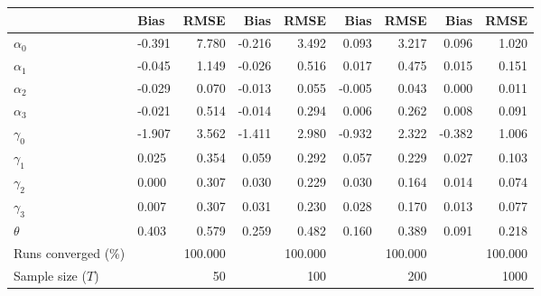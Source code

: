 
\begin{tabular}[t]{llrrrrrrr}
\toprule
  & Bias & RMSE & Bias & RMSE & Bias & RMSE & Bias & RMSE\\
\midrule
$\alpha_{0}$ & -0.391 & 7.780 & -0.216 & 3.492 & 0.093 & 3.217 & 0.096 & 1.020\\
$\alpha_{1}$ & -0.045 & 1.149 & -0.026 & 0.516 & 0.017 & 0.475 & 0.015 & 0.151\\
$\alpha_{2}$ & -0.029 & 0.070 & -0.013 & 0.055 & -0.005 & 0.043 & 0.000 & 0.011\\
$\alpha_{3}$ & -0.021 & 0.514 & -0.014 & 0.294 & 0.006 & 0.262 & 0.008 & 0.091\\
$\gamma_{0}$ & -1.907 & 3.562 & -1.411 & 2.980 & -0.932 & 2.322 & -0.382 & 1.006\\
$\gamma_{1}$ & 0.025 & 0.354 & 0.059 & 0.292 & 0.057 & 0.229 & 0.027 & 0.103\\
$\gamma_{2}$ & 0.000 & 0.307 & 0.030 & 0.229 & 0.030 & 0.164 & 0.014 & 0.074\\
$\gamma_{3}$ & 0.007 & 0.307 & 0.031 & 0.230 & 0.028 & 0.170 & 0.013 & 0.077\\
$\theta$ & 0.403 & 0.579 & 0.259 & 0.482 & 0.160 & 0.389 & 0.091 & 0.218\\
Runs converged (\%) &  & 100.000 &  & 100.000 &  & 100.000 &  & 100.000\\
Sample size ($T$) &  & 50 &  & 100 &  & 200 &  & 1000\\
\bottomrule
\end{tabular}
